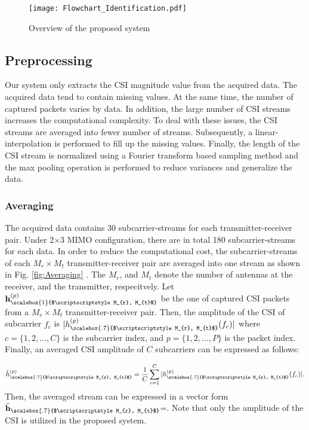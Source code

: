 \begin{landscape}
	\begin{figure}
		\begin{center}
			\texttt{[image: Flowchart\_Identification.pdf]}
		\end{center}
		\caption{Overview of the proposed system}
		\label{fig:flowchart}
	\end{figure}
\end{landscape}

\subsection{Preprocessing}
\label{sec:Preprocessing}
Our system only extracts the CSI magnitude value from the acquired data. The acquired data tend to contain missing values. At the same time, the number of captured packets varies by data. In addition, the large number of CSI streams increases the computational complexity. To deal with these issues, the CSI streams are averaged into fewer number of streams. Subsequently, a linear-interpolation is performed to fill up the missing values. Finally, the length of the CSI stream is normalized using a Fourier transform based sampling method and the max pooling operation is performed to reduce variances and generalize the data. 

\subsubsection{Averaging}
The acquired data contains 30 subcarrier-streams for each transmitter-receiver pair. Under 2$\times$3 MIMO configuration, there are in total 180 subcarrier-streams for each data. In order to reduce the computational cost, the subcarrier-streams of each $M_{r}\times M_{t}$ transmitter-receiver pair are averaged into one stream as shown in Fig. \ref{fig:Averaging} . The $M_{r}$, and $M_{t}$ denote the number of antennas at the receiver, and the transmitter, respecitvely. Let $\textbf{h}^{(p)}_{\scalebox{1}{$\scriptscriptstyle M_{r}, M_{t}$}}$ be the one of captured CSI packets from a $M_{r}\times M_{t}$ transmitter-receiver pair. Then, the amplitude of the CSI of subcarrier $f_{c}$ is $|h^{(p)}_{\scalebox{.7}{$\scriptscriptstyle M_{r}, M_{t}$}}(f_{c})|$ where $c=\{1,2,\hdots,C\}$ is the subcarrier index, and $p=\{1,2,\hdots,P\}$ is the packet index. Finally, an averaged CSI amplitude of $C$ subcarriers can be expressed as follows:

\begin{equation}
\tilde{h}^{(p)}_{\scalebox{.7}{$\scriptscriptstyle M_{r}, M_{t}$}}=
\frac{1}{C}\sum^{C}_{c=1}
|h^{(p)}_{\scalebox{.7}{$\scriptscriptstyle M_{r}, M_{t}$}}(f_{c})|. 
\label{eq:avg}
\end{equation}
Then, the averaged stream can be expressed in a vector form   $\tilde{\textbf{h}}_{\scalebox{.7}{$\scriptscriptstyle M_{r}, M_{t}$}}$=. Note that only the amplitude of the CSI is utilized in the proposed system. 

